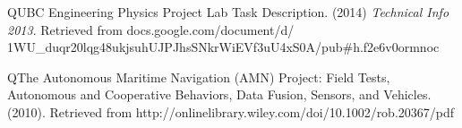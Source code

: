 \begin{thebibliography}{999}
\bibitem  QUBC Engineering Physics Project Lab Task Description. (2014) \textit{Technical Info 2013}. Retrieved from docs.google.com/document/d/\\1WU\_duqr20lqg48ukjsuhUJPJhsSNkrWiEVf3uU4xS0A/pub\#h.f2e6v0ormnoc

\bibitem  QThe Autonomous Maritime Navigation (AMN) Project:
Field Tests, Autonomous and Cooperative Behaviors,
Data Fusion, Sensors, and Vehicles. (2010). Retrieved from http://onlinelibrary.wiley.com/doi/10.1002/rob.20367/pdf

\end{thebibliography}